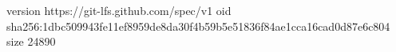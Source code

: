 version https://git-lfs.github.com/spec/v1
oid sha256:1dbc509943fe11ef8959de8da30f4b59b5e51836f84ae1cca16cad0d87e6c804
size 24890
